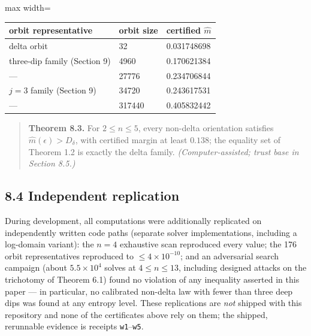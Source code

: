 \documentclass[11pt]{article}
\begin{document}
\begin{center}
\begin{adjustbox}{max width=\textwidth}
\begin{tabular}{lll}
orbit representative & orbit size & certified $\widehat m$ \\
\hline
delta orbit & 32 & 0.031748698 \\
three-dip family (Section 9) & 4960 & 0.170621384 \\
— & 27776 & 0.234706844 \\
$j{=}3$ family (Section 9) & 34720 & 0.243617531 \\
— & 317440 & 0.405832442 \\
\end{tabular}
\end{adjustbox}
\end{center}
\begin{quote}
\textbf{Theorem 8.3.}  For $2 \le n \le 5$, every non-delta orientation satisfies $\widehat m(\epsilon) > D_\delta$, with certified margin at least $0.138$; the equality set of Theorem 1.2 is exactly the delta family.  \emph{(Computer-assisted; trust base in Section 8.5.)}
\end{quote}
\subsection*{8.4 Independent replication}
During development, all computations were additionally replicated on independently written code paths (separate solver implementations, including a log-domain variant): the $n = 4$ exhaustive scan reproduced every value; the 176 orbit representatives reproduced to $\le 4\times10^{-10}$; and an adversarial search campaign (about $5.5\times10^4$ solves at $4 \le n \le 13$, including designed attacks on the trichotomy of Theorem 6.1) found no violation of any inequality asserted in this paper — in particular, no calibrated non-delta law with fewer than three deep dips was found at any entropy level.  These replications are \emph{not} shipped with this repository and none of the certificates above rely on them; the shipped, rerunnable evidence is receipts \texttt{w1}–\texttt{w5}.
\end{document}
